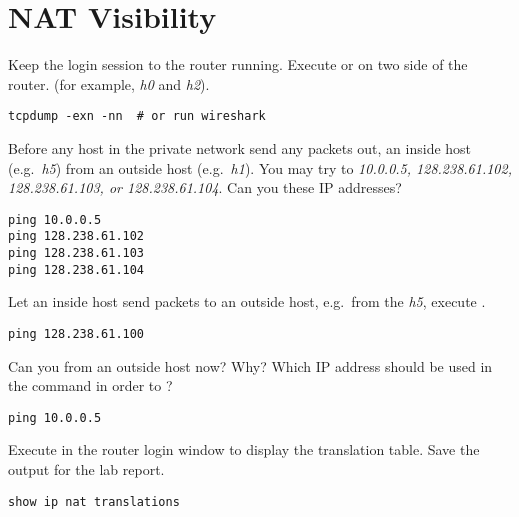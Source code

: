 \documentclass{../UTNetLab}
\begin{document}
\section{NAT Visibility}
Keep the login session to the router running.
Execute  or  on two side of the router.
(for example, \textit{h0} and  \textit{h2}).

\begin{lstlisting}
tcpdump -exn -nn  # or run wireshark
\end{lstlisting}


Before any host in the private network send any packets out,  an inside host (e.g.\ \textit{h5}) from an outside host (e.g.\ \textit{h1}).
You may try to  \textit{10.0.0.5, 128.238.61.102, 128.238.61.103, or 128.238.61.104}.
Can you  these IP addresses?

\begin{lstlisting}
ping 10.0.0.5
ping 128.238.61.102
ping 128.238.61.103
ping 128.238.61.104
\end{lstlisting}


Let an inside host send packets to an outside host, e.g.\ from the \textit{h5}, execute .

\begin{lstlisting}
ping 128.238.61.100
\end{lstlisting}

Can you  from an outside host now? Why? Which IP address should be used in the  command in order to ?

\begin{lstlisting}
ping 10.0.0.5
\end{lstlisting}

Execute  in the router login window to display the translation table.
Save the output for the lab report.

\begin{lstlisting}[language={cisco}, frame=trBL]
show ip nat translations
\end{lstlisting}
\end{document}
